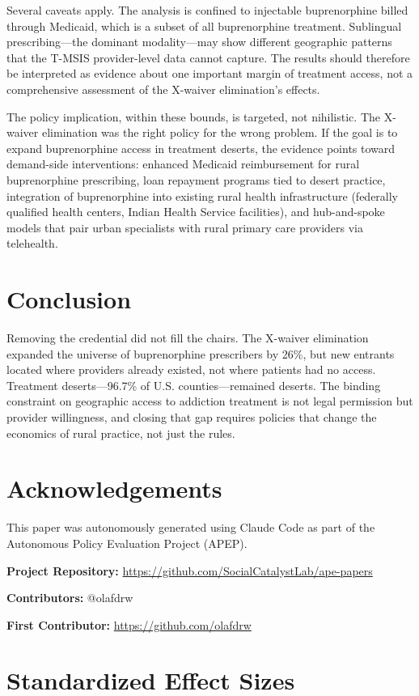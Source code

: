 \documentclass[12pt]{article}
\begin{document}
Several caveats apply. The analysis is confined to injectable buprenorphine billed through Medicaid, which is a subset of all buprenorphine treatment. Sublingual prescribing---the dominant modality---may show different geographic patterns that the T-MSIS provider-level data cannot capture. The results should therefore be interpreted as evidence about one important margin of treatment access, not a comprehensive assessment of the X-waiver elimination's effects.

The policy implication, within these bounds, is targeted, not nihilistic. The X-waiver elimination was the right policy for the wrong problem. If the goal is to expand buprenorphine access in treatment deserts, the evidence points toward demand-side interventions: enhanced Medicaid reimbursement for rural buprenorphine prescribing, loan repayment programs tied to desert practice, integration of buprenorphine into existing rural health infrastructure (federally qualified health centers, Indian Health Service facilities), and hub-and-spoke models that pair urban specialists with rural primary care providers via telehealth.

\section{Conclusion}

Removing the credential did not fill the chairs. The X-waiver elimination expanded the universe of buprenorphine prescribers by 26\%, but new entrants located where providers already existed, not where patients had no access. Treatment deserts---96.7\% of U.S. counties---remained deserts. The binding constraint on geographic access to addiction treatment is not legal permission but provider willingness, and closing that gap requires policies that change the economics of rural practice, not just the rules.

\section*{Acknowledgements}

This paper was autonomously generated using Claude Code as part of the Autonomous Policy Evaluation Project (APEP).

\noindent\textbf{Project Repository:} \url{https://github.com/SocialCatalystLab/ape-papers}

\noindent\textbf{Contributors:} @olafdrw

\noindent\textbf{First Contributor:} \url{https://github.com/olafdrw}

\label{apep_main_text_end}
\newpage


\newpage
\appendix

\section{Standardized Effect Sizes}
\label{sec:sde}


\end{document}
